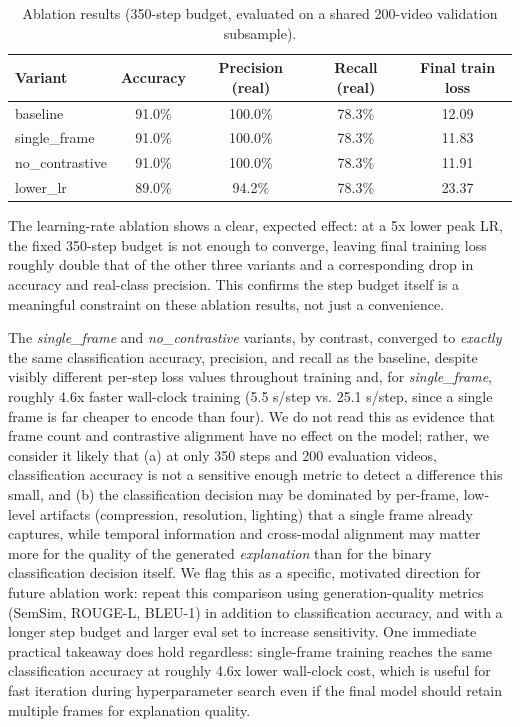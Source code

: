 \documentclass[acmsmall,review=false]{acmart}
\begin{document}
\begin{table}[h]
\centering
\caption{Ablation results (350-step budget, evaluated on a shared 200-video validation subsample).}
\label{tab:ablations}
\begin{tabular}{lcccc}
\toprule
\textbf{Variant} & \textbf{Accuracy} & \textbf{Precision (real)} & \textbf{Recall (real)} & \textbf{Final train loss} \\
\midrule
baseline       & 91.0\% & 100.0\% & 78.3\% & 12.09 \\
single\_frame  & 91.0\% & 100.0\% & 78.3\% & 11.83 \\
no\_contrastive& 91.0\% & 100.0\% & 78.3\% & 11.91 \\
lower\_lr      & 89.0\% &  94.2\% & 78.3\% & 23.37 \\
\bottomrule
\end{tabular}
\end{table}

The learning-rate ablation shows a clear, expected effect: at a 5x lower peak
LR, the fixed 350-step budget is not enough to converge, leaving final
training loss roughly double that of the other three variants and a
corresponding drop in accuracy and real-class precision. This confirms the
step budget itself is a meaningful constraint on these ablation results,
not just a convenience.

The \emph{single\_frame} and \emph{no\_contrastive} variants, by contrast,
converged to \emph{exactly} the same classification accuracy, precision, and
recall as the baseline, despite visibly different per-step loss values
throughout training and, for
\emph{single\_frame}, roughly 4.6x faster wall-clock training (5.5 s/step vs.
25.1 s/step, since a single frame is far cheaper to encode than four). We do
not read this as evidence that frame count and contrastive alignment have no
effect on the model; rather, we consider it likely that (a) at only 350 steps
and 200 evaluation videos, classification accuracy is not a sensitive enough
metric to detect a difference this small, and (b) the classification decision
may be dominated by per-frame, low-level artifacts (compression, resolution,
lighting) that a single frame already captures, while temporal information
and cross-modal alignment may matter more for the quality of the generated
\emph{explanation} than for the binary classification decision itself. We
flag this as a specific, motivated direction for future ablation work: repeat
this comparison using generation-quality metrics (SemSim, ROUGE-L, BLEU-1) in
addition to classification accuracy, and with a longer step budget and larger
eval set to increase sensitivity. One immediate practical takeaway does hold
regardless: single-frame training reaches the same classification accuracy at
roughly 4.6x lower wall-clock cost, which is useful for fast iteration during
hyperparameter search even if the final model should retain multiple frames
for explanation quality.
\end{document}
